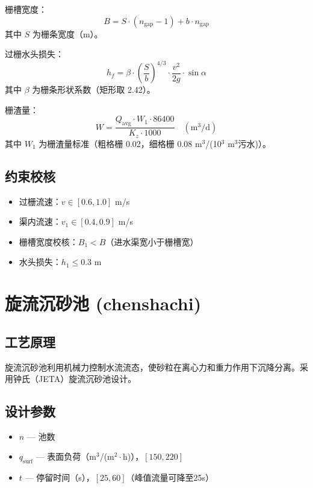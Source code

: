 \documentclass[12pt,a4paper]{ctexart}
\begin{document}
栅槽宽度：
\begin{equation}
B = S \cdot (n_{\text{gap}} - 1) + b \cdot n_{\text{gap}}
\end{equation}
其中 $S$ 为栅条宽度（m）。

过栅水头损失：
\begin{equation}
h_f = \beta \cdot \left(\frac{S}{b}\right)^{4/3} \cdot \frac{v^2}{2g} \cdot \sin \alpha
\end{equation}
其中 $\beta$ 为栅条形状系数（矩形取 2.42）。

栅渣量：
\begin{equation}
W = \frac{Q_{\text{avg}} \cdot W_1 \cdot 86400}{K_z \cdot 1000} \quad (\text{m}^3/\text{d})
\end{equation}
其中 $W_1$ 为栅渣量标准（粗格栅 0.02，细格栅 0.08 m$^3$/(10$^3$ m$^3$污水)）。

\subsection{约束校核}
\begin{itemize}
  \item 过栅流速：$v \in [0.6, 1.0]$ m/s
  \item 渠内流速：$v_1 \in [0.4, 0.9]$ m/s
  \item 栅槽宽度校核：$B_1 < B$（进水渠宽小于栅槽宽）
  \item 水头损失：$h_1 \leq 0.3$ m
\end{itemize}

\section{旋流沉砂池 (chenshachi)}

\subsection{工艺原理}
旋流沉砂池利用机械力控制水流流态，使砂粒在离心力和重力作用下沉降分离。采用钟氏（JETA）旋流沉砂池设计。

\subsection{设计参数}
\begin{itemize}
  \item $n$ — 池数
  \item $q_{\text{surf}}$ — 表面负荷（m$^3$/(m$^2\cdot$h)），$[150, 220]$
  \item $t$ — 停留时间（s），$[25, 60]$（峰值流量可降至25s）
\end{itemize}
\end{document}
